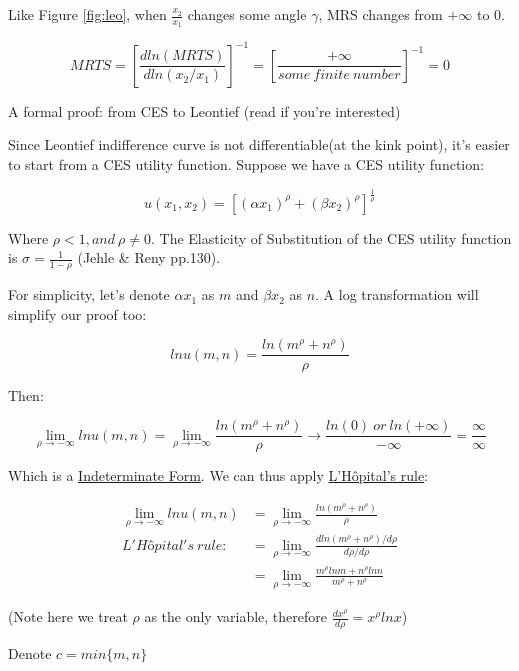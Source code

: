 \documentclass{article}
\begin{document}
\vspace{3mm}

Like Figure \ref{fig:leo}, when $\frac{x_2}{x_1}$ changes some angle $\gamma$, MRS changes from $+\infty$ to $0$.

$$MRTS = [\frac{d ln(MRTS)}{d ln(x_2/x_1)}]^{-1} =  [\frac{+\infty}{some \ finite \ number }]^{-1} = 0$$

\begin{mdframed}[backgroundcolor=blue!20,linecolor=white]
A formal proof: from CES to Leontief (read if you're interested)

\vspace{2mm}

Since Leontief indifference curve is not differentiable(at the kink point), it's easier to start from a CES utility function.
Suppose we have a CES utility function:

$$u(x_1,x_2) = [(\alpha x_1)^\rho + (\beta x_2)^\rho]^\frac{1}{\rho}$$

Where $\rho < 1, and \ \rho \ne 0$. The Elasticity of Substitution of the CES utility function is $\sigma = \frac{1}{1-\rho}$ (Jehle \& Reny pp.130).


For simplicity, let's denote $\alpha x_1$ as $m$ and $\beta x_2$ as $n$. A log transformation will simplify our proof too:

$$ln u(m,n) = \frac{ln(m^\rho + n^\rho)}{\rho}$$

Then:

$$\lim_{\rho \to -\infty} ln u(m,n) = \lim_{\rho \to -\infty}\frac{ln(m^\rho + n^\rho)}{\rho} \to \frac{ln(0) \ or \ ln(+\infty)}{-\infty} = \frac{\infty}{\infty}$$

Which is a \href{https://en.wikipedia.org/wiki/Indeterminate_form}{Indeterminate Form}. We can thus apply \href{https://en.wikipedia.org/wiki/L\%27H\%C3\%B4pital\%27s_rule}{L'Hôpital's rule}:

\begin{align*}
\lim_{\rho \to -\infty} ln u(m,n) &= \lim_{\rho \to -\infty}\frac{ln(m^\rho + n^\rho)}{\rho} \\
L'Hôpital's \ rule : \ \ \  &= \lim_{\rho \to -\infty} \frac{d ln(m^\rho + n^\rho) /d \rho}{d \rho / d\rho} \\
&= \lim_{\rho \to -\infty} \frac{m^\rho ln m+ n^\rho ln n}{m^\rho + n^\rho}
\end{align*}

(Note here we treat $\rho$ as the only variable, therefore $\frac{d x^\rho}{d\rho}=x^\rho lnx$)

Denote $c = min\{m,n\}$


\end{mdframed}
\end{document}
